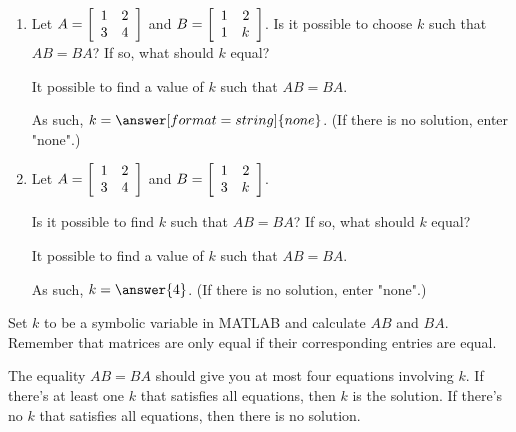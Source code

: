 \documentclass{ximera}
\author{Zack Reed}
\begin{document}
\begin{exercise}

\begin{enumerate}

    \item Let $A=\startmat{rr}
  1 & 2 \\
  3 & 4
\stopmat$ and $B=\startmat{rr}
  1 & 2 \\
  1 & k
\stopmat$. Is it possible to choose $k$ such that $AB=BA$? If so, what
should $k$ equal?

It  possible to find a value of $k$ such that $AB=BA$.

As such, $k=\answer[format=string]{none}$. (If there is no solution, enter "none".)

\item Let $A=\startmat{rr}
    1 & 2 \\
    3 & 4
  \stopmat$ and $B=\startmat{rr}
    1 & 2 \\
    3 & k
  \stopmat$. 
  
  Is it possible to find $k$ such that $AB=BA$? If
  so, what should $k$ equal?
  

It  possible to find a value of $k$ such that $AB=BA$.

    As such, $k=\answer{4}$. (If there is no solution, enter "none".)

\end{enumerate}

\begin{hint}
  

    Set $k$ to be a symbolic variable in MATLAB and calculate $AB$ and $BA$. Remember that matrices are only equal if their corresponding entries are equal.

    The equality $AB=BA$ should give you at most four equations involving $k$. If there's at least one $k$ that satisfies all equations, then $k$ is the solution. If there's no $k$ that satisfies all equations, then there is no solution.
  
    \end{hint}

\end{exercise}
\end{document}
